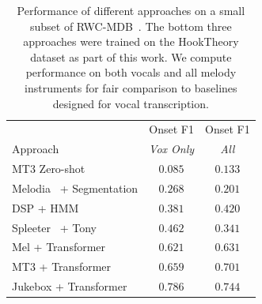 \documentclass{article}
\newcommand{\mel}{Mel}
\newcommand{\mtthree}{MT3}
\newcommand{\jukebox}{Jukebox}
\newcommand{\hooktheory}{HookTheory}
\newcommand{\rwc}{RWC-MDB}
\begin{document}
\begin{table}[]
    \centering
    \begin{tabular}{lcc}
\toprule
 & Onset F1 & Onset F1 \\
Approach & \emph{Vox Only} & \emph{All} \\
\midrule
MT3 Zero-shot~\cite{gardner2021mt3} & $0.085$ & $0.133$ \\
Melodia~\cite{salamon2014melody} + Segmentation & $0.268$ & $0.201$ \\
DSP + HMM~\cite{ryynanen2008automatic} & $0.381$ & $0.420$ \\
Spleeter~\cite{hennequin2020spleeter} + Tony~\cite{mauch2015computer} & $0.462$ & $0.341$ \\
\midrule
\mel{} + Transformer & $0.621$ & $0.631$ \\
\mtthree{} + Transformer & $0.659$ & $0.701$ \\
\jukebox{} + Transformer & $\mathbf{0.786}$ & $\mathbf{0.744}$ \\
\bottomrule
    \end{tabular}
    \caption{Performance of different approaches on a small subset of \rwc~\cite{goto2002rwc,goto2003rwc,goto2004development}. The bottom three approaches were trained on the \hooktheory{} dataset as part of this work. We compute performance on both vocals and all melody instruments for fair comparison to baselines designed for vocal transcription.}
    \label{tab:rwc_ryy}
\end{table}



\end{document}
